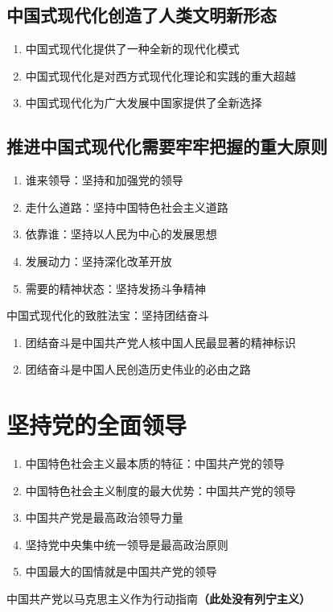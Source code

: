\documentclass{ctexart}
\numberwithin{figure}{section}
\numberwithin{equation}{section}
\begin{document}
    \subsection{中国式现代化创造了人类文明新形态}
        \begin{enumerate}
            \item 中国式现代化提供了一种全新的现代化模式
            \item 中国式现代化是对西方式现代化理论和实践的重大超越
            \item 中国式现代化为广大发展中国家提供了全新选择
        \end{enumerate}
    \subsection{推进中国式现代化需要牢牢把握的重大原则}
        \begin{enumerate}
            \item 谁来领导：坚持和加强党的领导
            \item 走什么道路：坚持中国特色社会主义道路
            \item 依靠谁：坚持以人民为中心的发展思想
            \item 发展动力：坚持深化改革开放
            \item 需要的精神状态：坚持发扬斗争精神
        \end{enumerate}
    中国式现代化的致胜法宝：坚持团结奋斗
        \begin{enumerate}
            \item 团结奋斗是中国共产党人核中国人民最显著的精神标识
            \item 团结奋斗是中国人民创造历史伟业的必由之路
        \end{enumerate}

\section{坚持党的全面领导}
    \begin{enumerate}
        \item 中国特色社会主义最本质的特征：中国共产党的领导
        \item 中国特色社会主义制度的最大优势：中国共产党的领导
        \item 中国共产党是最高政治领导力量
        \item 坚持党中央集中统一领导是最高政治原则
        \item 中国最大的国情就是中国共产党的领导
    \end{enumerate}
    中国共产党以马克思主义作为行动指南\textbf{（此处没有列宁主义）}
\end{document}
